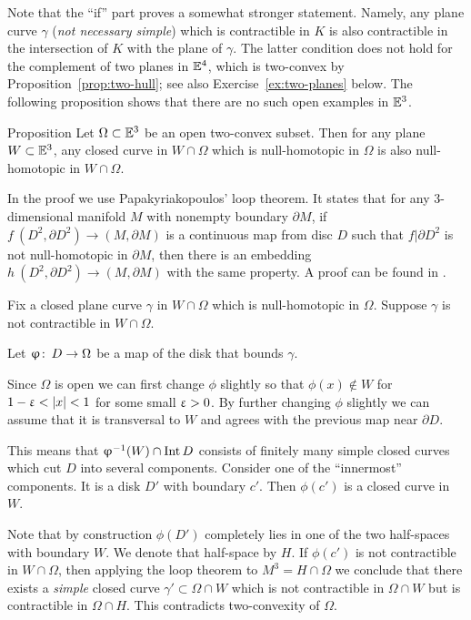 Note that the ``if'' part proves a somewhat stronger statement.
Namely,  any plane curve $\gamma$ (\emph{not necessary simple}) which is  contractible in $K$ is also contractible in the intersection of $K$ with the plane of $\gamma$.
The latter condition does not hold for the complement 
of two planes in $\mathbb{E}^4$, which is two-convex by Proposition~\ref{prop:two-hull};
see also Exercise~\ref{ex:two-planes} below.
The following proposition shows that there are no such open examples in $\mathbb{E}^3$.

\begin{thm}{Proposition}\label{prop:3d-strong-2-convexity}
Let $\Omega\subset\EE^3$ be an open two-convex subset.
Then for any plane $W\subset\EE^3$, 
any closed curve in $W\cap \Omega$ 
which is null-homotopic in $\Omega$ is also null-homotopic in $W\cap \Omega$.
\end{thm}

In the proof we use Papakyriakopoulos' loop theorem.
It states that for any 3-dimensional manifold $M$ with nonempty boundary $\partial M$, if 
$f\: (D^2,\partial D^2)\to (M,\partial M)$
is a continuous map from disc $D$ such that $f|\partial D^2$ is not null-homotopic in $\partial M$, then there is an embedding 
$h\: (D^2,\partial D^2)\to (M,\partial M)$ 
with the same property.
A proof can be found in \cite{hatcher}.

Fix a closed plane curve $\gamma$ in $W\cap \Omega$ which is null-homotopic in $\Omega$. Suppose $\gamma$ is not contractible in  $W\cap \Omega$.

Let $\phi\co D\to\Omega$ be a map of the disk that bounds $\gamma$.

Since $\Omega$ is open we can first change  $\phi$  slightly so that $\phi(x)\notin W$ for $1-\eps<|x|<1$ for some small $\upvarepsilon>0$.
By further changing $\phi$ slightly we can assume that it is transversal to $W$ and agrees with the previous map near $\partial D$.


This means that $\phi^{-1} (W)\cap \Int D$ consists of finitely many simple closed curves which cut $D$ into several components. 
Consider one of the ``innermost'' components. 
It is a disk $D'$ with boundary $c'$. 
Then  $\phi(c')$ is a closed curve in $W$. 

Note that by construction  $\phi(D')$  completely lies in one of the two half-spaces  with boundary $W$. 
We denote that half-space by $H$.
If $\phi(c')$ is not contractible in $W\cap \Omega$,  then applying the loop theorem to $M^3=H\cap \Omega$ we conclude that  there exists a \emph{simple} closed curve $\gamma'\subset \Omega\cap W$ which is not contractible in $\Omega\cap W$ but is contractible in $\Omega\cap H$. 
This contradicts two-convexity of $\Omega$. 

